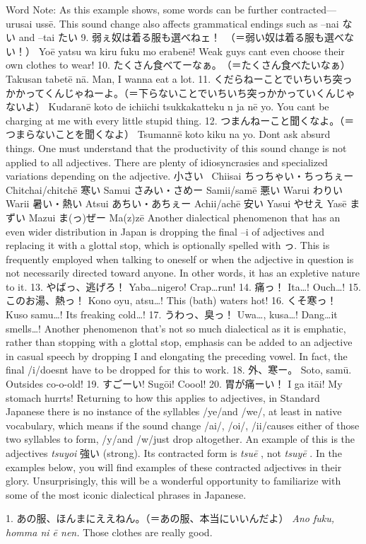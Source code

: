Word Note: As this example shows, some words can be further contracted—urusai \textrightarrow  ussē. This sound change also affects grammatical endings such as –nai ない and –tai たい 9. 弱ぇ奴は着る服も選べねェ！　（＝弱い奴は着る服も選べない！） Yoē yatsu wa kiru fuku mo erabenē! Weak guys can\textquotesingle t even choose their own clothes to wear! 10. たくさん食べてーなぁ。　（＝たくさん食べたいなぁ） Takusan tabetē nā. Man, I wanna eat a lot. 11. くだらねーことでいちいち突っかかってくんじゃねーよ。（＝下らないことでいちいち突っかかっていくんじゃないよ） Kudaranē koto de ichi\textquotesingle ichi tsukkakatteku n ja nē yo. You can\textquotesingle t be charging at me with every little stupid thing. 12. つまんねーこと聞くなよ。（＝つまらないことを聞くなよ） Tsuman\textquotesingle nē koto kiku na yo. Don\textquotesingle t ask absurd things. One must understand that the productivity of this sound change is not applied to all adjectives. There are plenty of idiosyncrasies and specialized variations depending on the adjective. 小さい  Chiisai  ちっちゃい・ちっちぇー Chitchai\slash chitchē  寒い Samui  さみい・さめー Samii\slash samē 悪い Warui  わりい Warii  暑い・熱い Atsui  あちい・あちぇー Achii\slash achē 安い Yasui  やせえ Yasē  まずい Mazui  ま(っ)ぜー Ma(z)zē \hfill\break
\hfill\break
\hfill\break
Another dialectical phenomenon that has an even wider distribution in Japan is dropping the final –i of adjectives and replacing it with a glottal stop, which is optionally spelled with っ. This is frequently employed when talking to oneself or when the adjective in question is not necessarily directed toward anyone. In other words, it has an expletive nature to it. 13. やばっ、逃げろ！ Yaba…nigero! Crap…run! 14. 痛っ！ Ita…! Ouch…! 15. このお湯、熱っ！ Kono oyu, atsu…! This (bath) water\textquotesingle s hot! 16. くそ寒っ！ Kuso samu…! It\textquotesingle s freaking cold…! 17. うわっ、臭っ！ Uwa…, kusa…! Dang…it smells…! Another phenomenon that's not so much dialectical as it is emphatic, rather than stopping with a glottal stop, emphasis can be added to an adjective in casual speech by dropping I and elongating the preceding vowel. In fact, the final \slash i\slash  doesn\textquotesingle t have to be dropped for this to work. 18. 外、寒ー。 Soto, samū. Outside\textquotesingle s co-o-old! 19. すごーい! Sugōi! Coool! 20. 胃が痛ーい！ I ga itāi! My stomach hurrts!   Returning to how this applies to adjectives, in Standard Japanese there is no instance of the syllables \slash ye\slash  and \slash we\slash , at least in native vocabulary, which means if the sound change \slash ai\slash , \slash oi\slash , \slash ii\slash  \textrightarrow  [ē] causes either of those two syllables to form, \slash y\slash  and \slash w\slash  just drop altogether. An example of this is the adjectives \emph{tsuyoi }強い (strong). Its contracted form is \emph{tsuē }, not \emph{tsuyē }. In the examples below, you will find examples of these contracted adjectives in their glory. Unsurprisingly, this will be a wonderful opportunity to familiarize with some of the most iconic dialectical phrases in Japanese.  
\par{1. あの服、ほんまにええねん。（＝あの服、本当にいいんだよ） \hfill\break
 \emph{Ano fuku, homma ni ē nen. }\hfill\break
Those clothes are really good. }
 
